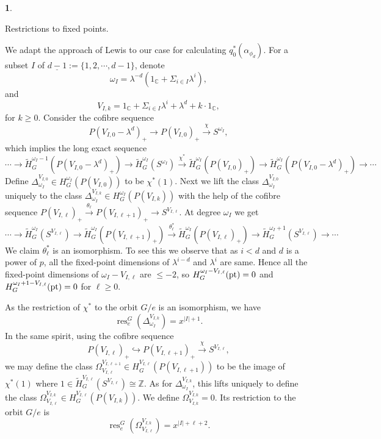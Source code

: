 \documentclass[a4paper,leqno,11pt]{amsart}
\theoremstyle{plain}
\theoremstyle{definition}
\newtheorem{subsec}[theorem]{}
\theoremstyle{remark}
\theoremstyle{definition}
\newcommand{\C}{{\mathbb C}}
\newcommand{\Z}{{\mathbb{Z}}}
\newcommand{\ra}{\rightarrow}
\newenvironment{myeq}[1][]
{\stepcounter{theorem}\begin{equation}\tag{\thetheorem}{#1}}
	{\end{equation}}
\newenvironment{mysubsection}[2][]
{\begin{subsec}\begin{upshape}\begin{bfseries}{#2.}
			\end{bfseries}{#1}}
		{\end{upshape}\end{subsec}}
\newcommand{\res}{\mathit{res}}
\def\Z{\mathbb{Z}}
\def\C{\mathbb{C}}
\def\ra{\rightarrow}
\def\xra{\xrightarrow}
\numberwithin{equation}{section}
\def\tH{\tilde{H}}
\newcommand{\pt}{\textup{pt}}
\renewcommand{\res}{\operatorname{res}}
\begin{document}
	\begin{mysubsection}{Restrictions to fixed points}
		We adapt the approach of Lewis \cite{Lewis} to our case for calculating $ q_0^*(\alpha_{\phi_d}) $.	For  a subset  $ I $ of $ \underline{d-1}:=\{1,2,\cdots, d-1\} $, denote 
		\[
		\omega_{I}=\lambda^{-d}(1_\C+\Sigma_{i\in I}\lambda^i),
		\]
		and 
		\[
		V_{I,k}=1_\C+\Sigma_{i\in I}\lambda^i+\lambda^d+k\cdot1_\C,
		\]
		for $ k\ge 0 $.  Consider the cofibre sequence 
		\[
		P(V_{I,0}-\lambda^d)_+\to P(V_{I,0})_+\xrightarrow{\chi} S^{\omega_I},
		\] 
		which implies the long exact sequence  
		\[
		\cdots \to \tH^{\omega_I -1}_{G}(P(V_{I,0}-\lambda^d)_+)\ra \tH^{\omega_I }_{G}(S^{\omega_I })\xra{\chi^*} \tH^{\omega_I }_{G}(P(V_{I,0})_+)\ra \tH^{\omega_I }_{G}(P(V_{I,0}-\lambda^d)_+)\ra\cdots
		\]
		Define $ \Delta_{\omega _I}^{V_{I,0}}\in  H^{\omega_I }_{G}(P(V_{I,0}))$ to be $ \chi^*(1) $. Next we lift the class $ \Delta_{\omega _I}^{V_{I,0}} $ uniquely to the class  $ \Delta_{\omega _I}^{V_{I,k}}\in H^{\omega_I }_{G}(P(V_{I,k})) $ with the help of the
		cofibre sequence $ P(V_{I,\ell})_+\xrightarrow{\theta_\ell} P(V_{I,\ell+1})_+\to S^{V_{I,\ell}}.  $
		At degree $  \omega _I $ we get
		\[
			\cdots\ra \tH^{\omega _I}_G(S^{V_{I,\ell}})\ra \tH^{\omega _I }_G(P(V_{I,\ell+1})_+)\xra{\theta_\ell^*}\tH^{\omega _I }_G(P(V_{I,\ell})_+)\ra \tH^{\omega _I+1 }_{G}(S^{V_{I,\ell}})\to\cdots
		\]
		We claim $ \theta_\ell^* $ is an isomorphism. To see this we observe that as $ i<d $ and $ d $ is a power of $ p $, all the fixed-point dimensions of  $ \lambda^{i-d} $ and $ \lambda^i $ are same. Hence all the fixed-point dimensions of $ \omega_I-V_{I,\ell} $ are $ \le -2 $, so  $ H^{\omega _I-V_{I,\ell}}_G(\pt) =0$ and $ H^{\omega _I+1-V_{I,\ell} }_{G}(\pt)=0 $ for $ \ell\ge0  $.\par
		As the restriction of $ \chi^* $ to the orbit $ G/e $ is an isomorphism, we have 
		\begin{myeq}\label{eq:res omeg I cp}
			\res_e^G(\Delta_{\omega _I}^{V_{I,k}}) =x^{|I|+1}.
		\end{myeq}
		In the same spirit, using the cofibre sequence 
		\[
		P(V_{I,\ell})_+\hookrightarrow  P(V_{I,\ell+1})_+\xrightarrow{\chi} S^{V_{I,\ell}},
		\]
		we may define the class $ \Omega^{V_{I,\ell+1}}_{V_{I,\ell} }\in H^{V_{I,\ell}  }_{G}(P(V_{I,\ell+1}))  $ to be the image of $ \chi^*(1) $ where $ 1\in \tH^{V_{I,\ell} }_{G}(S^{V_{I,\ell} })\cong \Z $. As for $\Delta^{V_{I,k}}_{\omega_I}$, this lifts uniquely to define  the class  $ \Omega^{V_{I,k}}_{V_{I,\ell} }\in H^{V_{I,\ell}  }_{G}(P(V_{I,k}))  $. We define $\Omega^{V_{I,k}}_{V_{I,k}}=0$. Its restriction to the orbit $ G/e $ is 
		\begin{equation*}\label{}
			\res_e^G(\Omega^{V_{I,k}}_{V_{I,\ell} }) =x^{|I|+\ell+2}.
		\end{equation*}
	\end{mysubsection}
\end{document}
